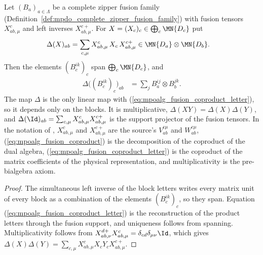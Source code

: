 \begin{lemma}%
    \label{thm:mpoalg_fusion_coproduct}
    \leanok
    Let $(B_a)_{a\in\Lambda}$ be a complete zipper fusion family
    (Definition~\ref{def:mpdo_complete_zipper_fusion_family}) with fusion
    tensors $X^c_{ab,\mu}$ and left inverses $X^{c+}_{ab,\mu}$. For
    $X=(X_c)_c\in\bigoplus_c\MN{D_c}$ put
    \begin{align}
        \Delta(X)_{ab}
         & =\sum_{c,\mu}X^c_{ab,\mu}\,X_c\,X^{c+}_{ab,\mu}
        \in\MN{D_a}\otimes\MN{D_b}.
        \label{eq:mpoalg_fusion_coproduct}
    \end{align}
    Then the elements $(B_c^{ik})_c$ span $\bigoplus_c\MN{D_c}$, and
    \begin{align}
        \Delta\big((B_c^{ik})_c\big)_{ab}
         & =\sum_jB_a^{ij}\otimes B_b^{jk}.
        \label{eq:mpoalg_fusion_coproduct_letter}
    \end{align}
    The map $\Delta$ is the only linear map with
    (\ref{eq:mpoalg_fusion_coproduct_letter}), so it depends only on the
    blocks. It is multiplicative, $\Delta(XY)=\Delta(X)\Delta(Y)$, and
    $\Delta(\Id)_{ab}=\sum_{c,\mu}X^c_{ab,\mu}X^{c+}_{ab,\mu}$ is the support
    projector of the fusion tensors. In the notation of
    \cite[Section~4]{Molnar2022MPOAlgebrasI}, $X^c_{ab,\mu}$ and
    $X^{c+}_{ab,\mu}$ are the source's $V_{ab}^{c\mu}$ and $W_{ab}^{c\mu}$,
    (\ref{eq:mpoalg_fusion_coproduct}) is the decomposition of the coproduct of
    the dual algebra, (\ref{eq:mpoalg_fusion_coproduct_letter}) is the
    coproduct of the matrix coefficients of the physical representation, and
    multiplicativity is the pre-bialgebra axiom.
\end{lemma}

\begin{proof}
    \leanok
    The simultaneous left inverse of the block letters writes every matrix
    unit of every block as a combination of the elements $(B_c^{ik})_c$, so
    they span. Equation (\ref{eq:mpoalg_fusion_coproduct_letter}) is the
    reconstruction of the product letters through the fusion support, and
    uniqueness follows from spanning. Multiplicativity follows from
    $X^{d+}_{ab,\nu}X^c_{ab,\mu}=\delta_{cd}\delta_{\mu\nu}\Id$, which gives
    $\Delta(X)\Delta(Y)=\sum_{c,\mu}X^c_{ab,\mu}X_cY_cX^{c+}_{ab,\mu}$.
\end{proof}

